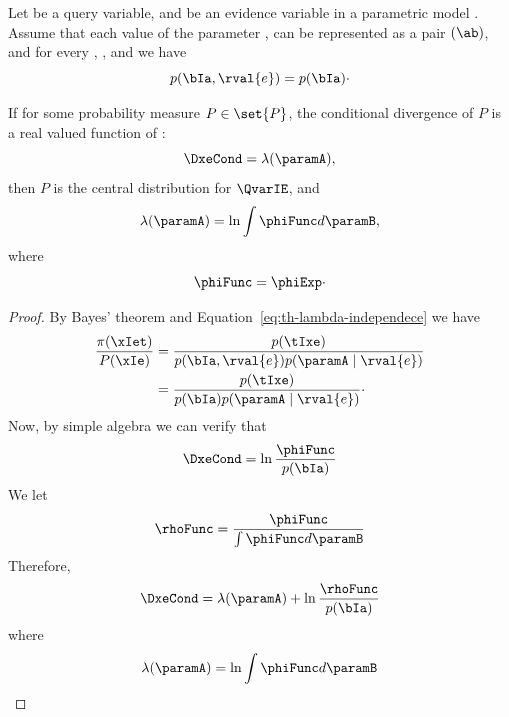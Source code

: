 \begin{theorem}
    \label{th:lambda}
    Let \Qvar be a query variable, and \Evar be an evidence variable in a parametric model \pmodel.
    Assume that each value of the parameter \paramValue, can be represented as a pair $(\ab)$, and for
    every
    \paramA, \paramB, and  we have
    \begin{equation}
        \label{eq:th-lambda-independece}
        p(\bIa, \rval{e}) = p(\bIa) \cdot
    \end{equation}

    If for some probability measure $P \in \set{P}$, the conditional divergence of $P$ is a real valued function
    of \paramA:
    \begin{equation*}
        \DxeCond = \lambda(\paramA),
    \end{equation*}
    then $P$ is the central distribution for $\QvarIE$, and
    \begin{equation*}
        \lambda(\paramA) = \ln \int \phiFunc d\paramB,
    \end{equation*}
    where
    \begin{equation*}
        \phiFunc = \phiExp \cdot
    \end{equation*}

\end{theorem}

\begin{proof}
    \newcommand{\lambdaFunc}{\lambda(\paramA)}
    By Bayes' theorem and Equation~\ref{eq:th-lambda-independece} we have
    \begin{align*}
        \frac{\pi(\xIet)}{P(\xIe)} &= \frac{p(\tIxe)}{p(\bIa, \rval{e})p(\paramA \mid \rval{e})} \\
        &= \frac{p(\tIxe)}{p(\bIa)p(\paramA \mid \rval{e})} \cdot
    \end{align*}
    Now, by simple algebra we can verify that
    \begin{equation*}
        \DxeCond = \ln \frac{\phiFunc}{p(\bIa)}
    \end{equation*}
    We let
    \begin{equation*}
        \rhoFunc = \frac{\phiFunc}{\int \phiFunc d\paramB}
    \end{equation*}
    Therefore,
    \begin{equation*}
        \DxeCond = \lambdaFunc + \ln \frac{\rhoFunc}{p(\bIa)}
    \end{equation*}
    where
    \[
        \lambdaFunc =  \ln \int \phiFunc d\paramB
    \]
\end{proof}

